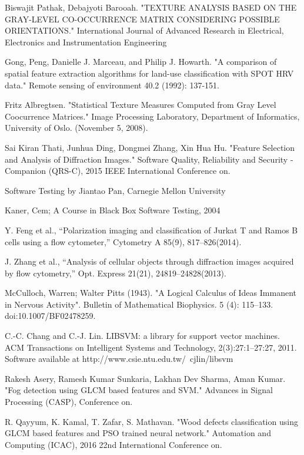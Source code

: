 \begin{thebibliography}{99}
Biswajit Pathak, Debajyoti Barooah. "TEXTURE ANALYSIS BASED ON THE GRAY-LEVEL CO-OCCURRENCE MATRIX CONSIDERING POSSIBLE ORIENTATIONS." International Journal of Advanced Research in Electrical, Electronics and Instrumentation Engineering 

Gong, Peng, Danielle J. Marceau, and Philip J. Howarth. "A comparison of spatial feature extraction algorithms for land-use classification with SPOT HRV data." Remote sensing of environment 40.2 (1992): 137-151.

Fritz Albregtsen. "Statistical Texture Measures Computed from Gray Level Coocurrence Matrices." Image Processing Laboratory, Department of Informatics, University of Oslo. (November 5, 2008).

Sai Kiran Thati, Junhua Ding, Dongmei Zhang, Xin Hua Hu. "Feature Selection and Analysis of Diffraction Images." Software Quality, Reliability and Security - Companion (QRS-C), 2015 IEEE International Conference on.

Software Testing by Jiantao Pan, Carnegie Mellon University

Kaner, Cem; A Course in Black Box Software Testing, 2004

Y. Feng et al., “Polarization imaging and classification of Jurkat T and Ramos B cells using a flow cytometer,” Cytometry A 85(9), 817–826(2014).

J. Zhang et al., “Analysis of cellular objects through diffraction images acquired by flow cytometry,” Opt. Express 21(21), 24819–24828(2013).

McCulloch, Warren; Walter Pitts (1943). "A Logical Calculus of Ideas Immanent in Nervous Activity". Bulletin of Mathematical Biophysics. 5 (4): 115–133. doi:10.1007/BF02478259.

C.-C. Chang and C.-J. Lin. LIBSVM: a library for support vector machines. ACM
Transactions on Intelligent Systems and Technology, 2(3):27:1–27:27, 2011. Software
available at http://www.csie.ntu.edu.tw/~cjlin/libsvm

Rakesh Asery, Ramesh Kumar Sunkaria, Lakhan Dev Sharma, Aman Kumar. "Fog detection using GLCM based features and SVM." Advances in Signal Processing (CASP), Conference on.

R. Qayyum, K. Kamal, T. Zafar, S. Mathavan. "Wood defects classification using GLCM based features and PSO trained neural network." Automation and Computing (ICAC), 2016 22nd International Conference on.
\end{thebibliography}
